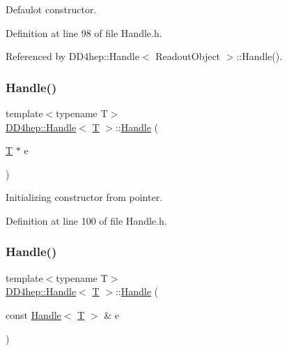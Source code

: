Defaulot constructor. 



Definition at line 98 of file Handle.\+h.



Referenced by D\+D4hep\+::\+Handle$<$ Readout\+Object $>$\+::\+Handle().

\hypertarget{class_d_d4hep_1_1_handle_aae5fd1b909826186406e57e41679ab8d}{}\label{class_d_d4hep_1_1_handle_aae5fd1b909826186406e57e41679ab8d} 
\subsubsection{\texorpdfstring{Handle()}{Handle()}\hspace{0.1cm}{\footnotesize\ttfamily [2/5]}}
{\footnotesize\ttfamily template$<$typename T$>$ \\
\hyperlink{class_d_d4hep_1_1_handle}{D\+D4hep\+::\+Handle}$<$ \hyperlink{class_t}{T} $>$\+::\hyperlink{class_d_d4hep_1_1_handle}{Handle} (\begin{DoxyParamCaption}\item[{\hyperlink{class_t}{T} $\ast$}]{e }\end{DoxyParamCaption})\hspace{0.3cm}{\ttfamily [inline]}}



Initializing constructor from pointer. 



Definition at line 100 of file Handle.\+h.

\hypertarget{class_d_d4hep_1_1_handle_a3c86f2f41a1ac3c3b86c179be2d4d67b}{}\label{class_d_d4hep_1_1_handle_a3c86f2f41a1ac3c3b86c179be2d4d67b} 
\subsubsection{\texorpdfstring{Handle()}{Handle()}\hspace{0.1cm}{\footnotesize\ttfamily [3/5]}}
{\footnotesize\ttfamily template$<$typename T$>$ \\
\hyperlink{class_d_d4hep_1_1_handle}{D\+D4hep\+::\+Handle}$<$ \hyperlink{class_t}{T} $>$\+::\hyperlink{class_d_d4hep_1_1_handle}{Handle} (\begin{DoxyParamCaption}\item[{const \hyperlink{class_d_d4hep_1_1_handle}{Handle}$<$ \hyperlink{class_t}{T} $>$ \&}]{e }\end{DoxyParamCaption})\hspace{0.3cm}{\ttfamily [default]}}



